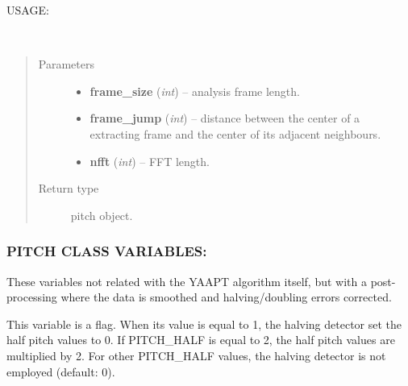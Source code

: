 \documentclass[letterpaper,10pt,english]{sphinxmanual}
\begin{document}
USAGE:

\begin{fulllineitems}
\label{pYAAPT:amfm_decompy.pYAAPT.PitchObj}~\begin{quote}\begin{description}
\item[{Parameters}] \leavevmode\begin{itemize}
\item {} 
\textbf{frame\_size} (\emph{int}) -- analysis frame length.

\item {} 
\textbf{frame\_jump} (\emph{int}) -- distance between the center of a extracting frame and the center of its adjacent neighbours.

\item {} 
\textbf{nfft} (\emph{int}) -- FFT length.

\end{itemize}

\item[{Return type}] \leavevmode
pitch object.

\end{description}\end{quote}

\end{fulllineitems}



\subsubsection{PITCH CLASS VARIABLES:}
\label{pYAAPT:pitch-class-variables}
These variables not related with the YAAPT algorithm itself, but with a post-processing where the data is smoothed and halving/doubling errors corrected.

\begin{fulllineitems}
\label{pYAAPT:PitchObj.PITCH_HALF}
This variable is a flag. When its value is equal to 1, the halving detector set the half pitch values to 0. If PITCH\_HALF is equal to 2, the half pitch values are multiplied by 2. For other PITCH\_HALF values, the halving detector is not employed (default: 0).

\end{fulllineitems}
\end{document}
